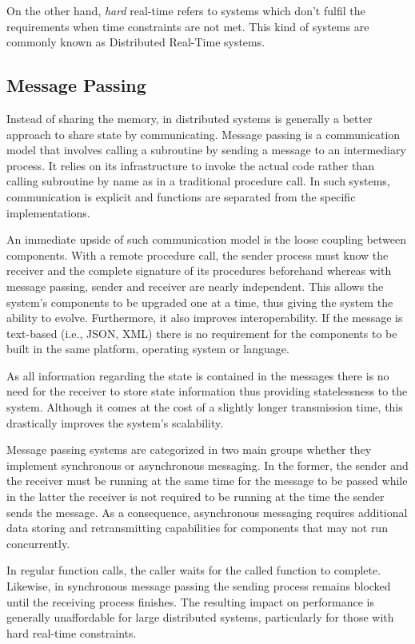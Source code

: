 On the other hand, \textit{hard} real-time refers to systems which don't fulfil the requirements when time constraints are not met. This kind of systems are commonly known as Distributed Real-Time systems.

\subsection{Message Passing} \label{message_passing}

Instead of sharing the memory, in distributed systems is generally a better approach to share state by communicating. Message passing is a communication model that involves calling a subroutine by sending a message to an intermediary process. It relies on its infrastructure to invoke the actual code rather than calling subroutine by name as in a traditional procedure call. In such systems, communication is explicit and functions are separated from the specific implementations.

An immediate upside of such communication model is the loose coupling between components. With a remote procedure call, the sender process must know the receiver and the complete signature of its procedures beforehand whereas with message passing, sender and receiver are nearly independent. This allows the system's components to be upgraded one at a time, thus giving the system the ability to evolve. Furthermore, it also improves interoperability. If the message is text-based (i.e., JSON, XML) there is no requirement for the components to be built in the same platform, operating system or language.

As all information regarding the state is contained in the messages there is no need for the receiver to store state information thus providing statelessness to the system. Although it comes at the cost of a slightly longer transmission time, this drastically improves the system's scalability.

Message passing systems are categorized in two main groups whether they implement synchronous or asynchronous messaging. In the former, the sender and the receiver must be running at the same time for the message to be passed while in the latter the receiver is not required to be running at the time the sender sends the message. As a consequence, asynchronous messaging requires additional data storing and retransmitting capabilities for components that may not run concurrently.

In regular function calls, the caller waits for the called function to complete. Likewise, in synchronous message passing the sending process remains blocked until the receiving process finishes. The resulting impact on performance is generally unaffordable for large distributed systems, particularly for those with hard real-time constraints.

